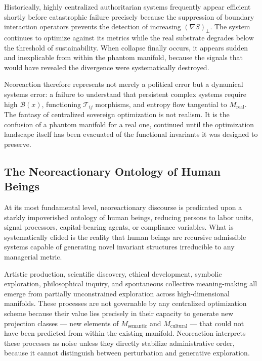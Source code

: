 \documentclass[12pt, a4paper]{article}
\theoremstyle{essaystyle}
\begin{document}
Historically, highly centralized authoritarian systems frequently appear efficient
shortly before catastrophic failure precisely because the suppression of boundary
interaction operators prevents the detection of increasing $(\nabla S)_\perp$. The
system continues to optimize against its metrics while the real substrate degrades
below the threshold of sustainability. When collapse finally occurs, it appears
sudden and inexplicable from within the phantom manifold, because the signals that
would have revealed the divergence were systematically destroyed.

Neoreaction therefore represents not merely a political error but a dynamical
systems error: a failure to understand that persistent complex systems require high
$\mathcal{B}(x)$, functioning $\mathcal{T}_{ij}$ morphisms, and entropy flow
tangential to $M_{\mathrm{real}}$. The fantasy of centralized sovereign optimization
is not realism. It is the confusion of a phantom manifold for a real one, continued
until the optimization landscape itself has been evacuated of the functional
invariants it was designed to preserve.

\subsection{The Neoreactionary Ontology of Human Beings}

At its most fundamental level, neoreactionary discourse is predicated upon a starkly
impoverished ontology of human beings, reducing persons to labor units, signal
processors, capital-bearing agents, or compliance variables. What is systematically
elided is the reality that human beings are recursive admissible systems capable of
generating novel invariant structures irreducible to any managerial metric.

Artistic production, scientific discovery, ethical development, symbolic exploration,
philosophical inquiry, and spontaneous collective meaning-making all emerge from
partially unconstrained exploration across high-dimensional manifolds. These processes
are not governable by any centralized optimization scheme because their value lies
precisely in their capacity to generate new projection classes --- new elements of
$M_{\mathrm{semantic}}$ and $M_{\mathrm{cultural}}$ --- that could not have been
predicted from within the existing manifold. Neoreaction interprets these processes
as noise unless they directly stabilize administrative order, because it cannot
distinguish between perturbation and generative exploration.
\end{document}
